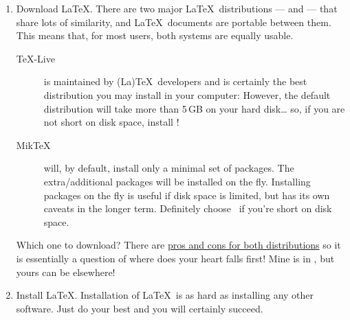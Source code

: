 \begin{enumerate}
  \item Download \LaTeX.  There are two major \LaTeX\ distributions — \href{https://miktex.org/}{\MikTeX} and \href{https://www.tug.org/texlive/}{\TeXLive} — that share lots of similarity, and \LaTeX\ documents are portable between them. This means that, for most users, both systems are equally usable.
        \begin{description}
          \item [\TeX-Live] is maintained by (La)\TeX\ developers and is certainly the best distribution you may install in your computer:  However, the default distribution will take more than 5\,GB on your hard disk… so, if you are not short on disk space, install \TeXLive!
          \item[Mik\TeX] will, by default, install only a minimal set of packages. The extra/additional packages will be installed on the fly.  Installing packages on the fly is useful if disk space is limited, but has its own caveats in the longer term.  Definitely choose \MikTeX\ if you're short on disk space.
        \end{description}
        Which one to download?  There are \href{https://tex.stackexchange.com/questions/20036/what-are-the-advantages-of-tex-live-over-miktex}{pros and cons for both distributions} so it is essentially a question of where does your heart falls first!  Mine is in \TeXLive, but yours can be elsewhere!  \emojiSmile

  \item Install \LaTeX. Installation of \LaTeX\ is as hard as installing any other software.  Just do your best and you will certainly succeed.


\end{enumerate}
